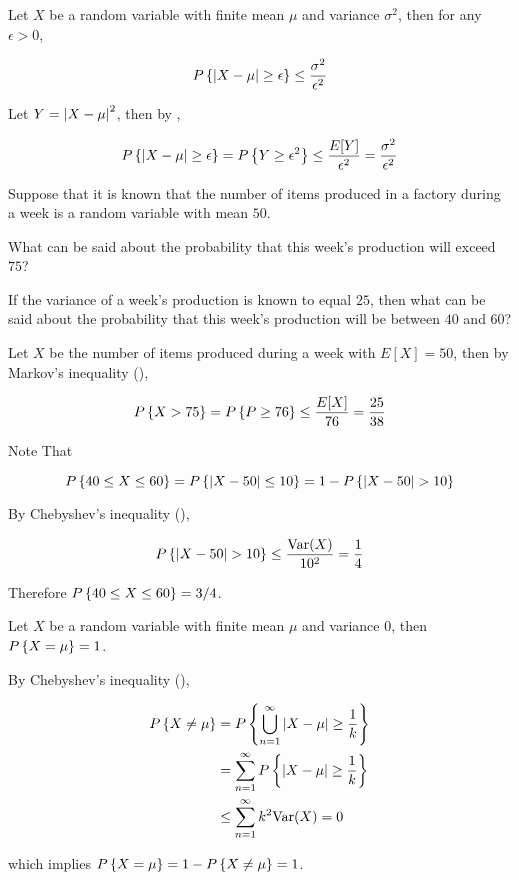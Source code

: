 \documentclass[a4paper,12pt]{article}
\begin{document}
\begin{thm}
  Let $X$ be a random variable with finite mean $\mu$ and variance $\sigma^{2}$, then for any $\epsilon>0$,

  $$P\left\{ \left| X-\mu\right|\geq\epsilon\right\}\leq\frac{\sigma^{2}}{\epsilon^{2}}$$\s

  \prf Let $Y=\left| X-\mu\right|^{2}$, then by \rthm[\sctd{1}],

  $$P\left\{ \left| X-\mu\right|\geq\epsilon\right\}=P\left\{ Y\geq\epsilon^{2}\right\}\leq\frac{E[Y]}{\epsilon^{2}}=\frac{\sigma^{2}}{\epsilon^{2}}$$
\end{thm}\n

\begin{exm}
  Suppose that it is known that the number of items produced in a factory during a week is a random variable with mean $50$.

  \begin{alist}
  \item What can be said about the probability that this week’s production will exceed $75$?
  \item If the variance of a week’s production is known to equal $25$, then what can be said about the probability that this week’s production will be between $40$ and $60$?
  \end{alist}

  \ans{} Let $X$ be the number of items produced during a week with $E[X]=50$, then by Markov's inequality (\rthm[\sctd{2}]),

  $$P\left\{ X>75\right\}=P\left\{ P\geq 76\right\}\leq\frac{E[X]}{76}=\frac{25}{38}$$\s

   Note That
  
  $$P\brc{40\leq X\leq 60}=P\brc{\abs{X-50}\leq 10}=1-P\brc{\abs{X-50}>10}$$\s

  By Chebyshev's inequality (\rthm[\sctd{1}]),

  $$P\brc{\abs{X-50}>10}\leq\frac{\mathrm{Var}(X)}{10^{2}}=\frac{1}{4}$$\s

  Therefore $P\left\{ 40\leq X\leq 60\right\}=3/4$.
\end{exm}\n

\begin{pst}
  Let $X$ be a random variable with finite mean $\mu$ and variance $0$, then $P\left\{ X=\mu\right\}=1$.\n

  \prf By Chebyshev's inequality (\rthm[\sctd{2}]),

  $$\begin{aligned}[t]
    P\left\{ X\neq\mu\right\}&=P\left\{ \bigcup_{n=1}^{\infty}\left| X-\mu\right|\geq\frac{1}{k}\right\}\\
    &=\sum_{n=1}^{\infty}P\left\{ \left| X-\mu\right|\geq\frac{1}{k}\right\}\\
    &\leq\sum_{n=1}^{\infty}k^{2}\mathrm{Var}(X)=0
  \end{aligned}$$\s

  which implies $P\left\{ X=\mu\right\}=1-P\left\{ X\neq\mu\right\}=1$.
\end{pst}
\end{document}
